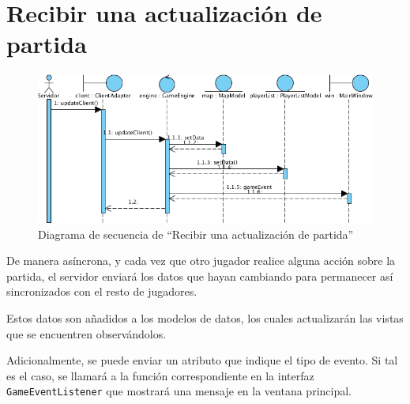\section{Recibir una actualización de partida}

\begin{figure}[ht]
\centering
\includegraphics[scale=0.6]{img/ch03devel-update.png}
\caption{Diagrama de secuencia de ``Recibir una actualización de partida''}
\end{figure}

De manera asíncrona, y cada vez que otro jugador realice alguna acción sobre la
partida, el servidor enviará los datos que hayan cambiando para permanecer así
sincronizados con el resto de jugadores.

Estos datos son añadidos a los modelos de datos, los cuales actualizarán las
vistas que se encuentren observándolos.

Adicionalmente, se puede enviar un atributo que indique el tipo de evento. Si
tal es el caso, se llamará a la función correspondiente en la interfaz
\texttt{GameEventListener} que mostrará una mensaje en la ventana principal.

